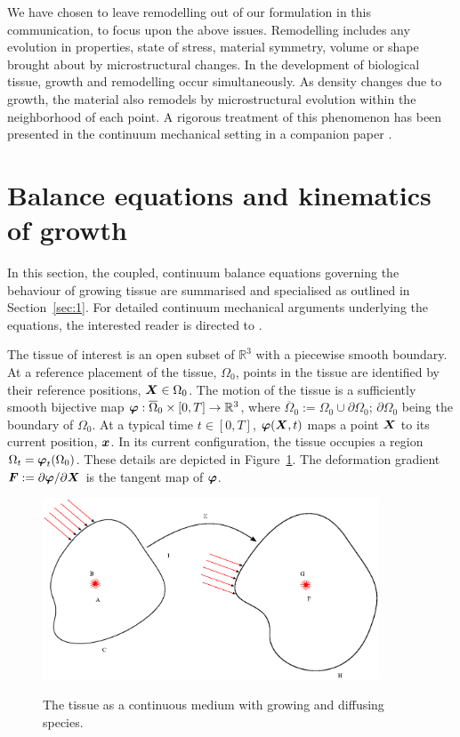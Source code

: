 We have chosen to leave remodelling out of our formulation in this
communication, to focus upon the above issues. Remodelling
includes any evolution in properties, state of stress, material
symmetry, volume or shape brought about by microstructural
changes. In the development of biological tissue, growth and
remodelling occur simultaneously. As density changes due to
growth, the material also remodels by microstructural evolution
within the neighborhood of each point. A rigorous treatment of
this phenomenon has been presented in the continuum mechanical
setting in a companion paper \citep{remodelpaper}.




\section{Balance equations and kinematics of growth}
\label{sec:2}

In this section, the coupled, continuum balance equations governing
the behaviour of growing tissue are summarised and specialised as
outlined in Section~\ref{sec:1}. For detailed continuum mechanical
arguments underlying the equations, the interested reader is directed
to \citet{growthpaper}.

The tissue of interest is an open subset of $\mathbb{R}^3$ with a
piecewise smooth boundary. At a reference placement of the tissue,
$\Omega_0$, points in the tissue are identified by their reference
positions, $\mbox{\boldmath$ X$} \in \Omega_0$. The motion of the tissue is a
sufficiently smooth bijective map $\mbox{\boldmath$\varphi$}: \overline{\Omega}_0
\times [0,T] \rightarrow \mathbb{R}^3$, where $\overline{\Omega}_0 :=
\Omega_0 \cup \partial\Omega_0$; $\partial\Omega_0$ being the boundary
of $\Omega_0$. At a typical time $t \in [0,T]$, $\mbox{\boldmath$\varphi$}(\mbox{\boldmath$ X$},t)$ maps
a point $\mbox{\boldmath$ X$}$ to its current position, $\mbox{\boldmath$ x$}$. In its current
configuration, the tissue occupies a region $\Omega_t = \mbox{\boldmath$\varphi$}_t
(\Omega_0)$. These details are depicted in Figure~\ref{cp}. The
deformation gradient $\mbox{\boldmath$ F$} := \partial \mbox{\boldmath$\varphi$}/ \partial\mbox{\boldmath$ X$}$ is the
tangent map of $\mbox{\boldmath$\varphi$}$.

\begin{figure}[ht]
  \centering
	 {\includegraphics[width=10.00cm]{images/cp-mass-solute.eps}}
	 \caption{The tissue as a continuous medium with growing and
           diffusing species.}
	 \label{cp}
\end{figure}

